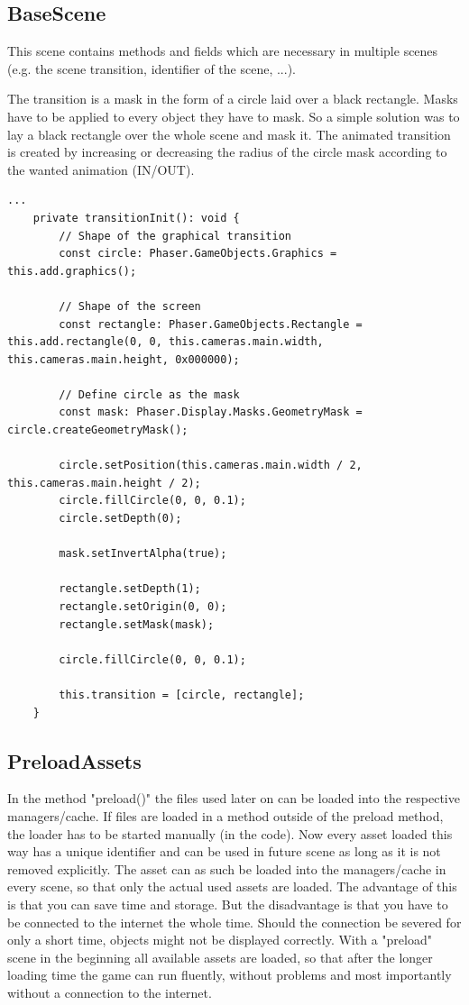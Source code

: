 \subsection{BaseScene}\label{subsec:basescene}
This scene contains methods and fields which are necessary in multiple scenes
(e.g. the scene transition, identifier of the scene, ...).

The transition is a mask in the form of a circle laid over a black rectangle.
Masks have to be applied to every object they have to mask.
So a simple solution was to lay a black rectangle over the whole scene and mask it.
The animated transition is created by increasing or decreasing the radius of the circle
mask according to the wanted animation (IN/OUT).

\begin{lstlisting}[style=TypeScript, caption={BaseScene.ts}]
    ...
    private transitionInit(): void {
        // Shape of the graphical transition
        const circle: Phaser.GameObjects.Graphics = this.add.graphics();

        // Shape of the screen
        const rectangle: Phaser.GameObjects.Rectangle = this.add.rectangle(0, 0, this.cameras.main.width, this.cameras.main.height, 0x000000);

        // Define circle as the mask
        const mask: Phaser.Display.Masks.GeometryMask = circle.createGeometryMask();

        circle.setPosition(this.cameras.main.width / 2, this.cameras.main.height / 2);
        circle.fillCircle(0, 0, 0.1);
        circle.setDepth(0);

        mask.setInvertAlpha(true);

        rectangle.setDepth(1);
        rectangle.setOrigin(0, 0);
        rectangle.setMask(mask);

        circle.fillCircle(0, 0, 0.1);

        this.transition = [circle, rectangle];
    }
\end{lstlisting}

\subsection{PreloadAssets}\label{subsec:preloadassets}
In the method "preload()" the files used later on can be loaded into the respective managers/cache.
If files are loaded in a method outside of the preload method, the loader has to be started manually (in the code).
Now every asset loaded this way has a unique identifier and can be used in future scene
as long as it is not removed explicitly.
The asset can as such be loaded into the managers/cache in every scene,
so that only the actual used assets are loaded.
The advantage of this is that you can save time and storage.
But the disadvantage is that you have to be connected to the internet the whole time.
Should the connection be severed for only a short time, objects might not be displayed correctly.
With a "preload" scene in the beginning all available assets are loaded,
so that after the longer loading time the game can run fluently,
without problems and most importantly without a connection to the internet.


